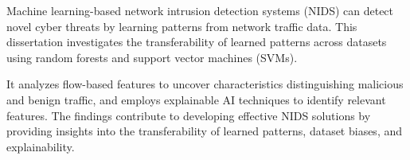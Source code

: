 Machine learning-based network intrusion detection systems (NIDS) can detect novel cyber threats by learning patterns from network traffic data. This dissertation investigates the transferability of learned patterns across datasets using random forests and support vector machines (SVMs).

\noindent It analyzes flow-based features to uncover characteristics distinguishing malicious and benign traffic, and employs explainable AI techniques to identify relevant features. The findings contribute to developing effective NIDS solutions by providing insights into the transferability of learned patterns, dataset biases, and explainability.